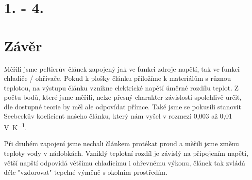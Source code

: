 \documentclass{protokol}
\begin{document}

%		
%		
%		
%		

\section{1. - 4.}



		
\section{Závěr}
	Měřili jsme peltierův článek zapojený jak ve funkci zdroje napětí, tak ve funkci chladiče / ohřívače. Pokud k plošky článku přiložíme k materiálům s různou teplotou, na výstupu článku vznikne elektrické napětí úměrné rozdílu teplot. Z počtu bodů, které jsme měřili, nelze přesný charakter závislosti spolehlivě určit, dle dostupné teorie by měl ale odpovídat přímce. Také jsme se pokusili stanovit Seebeckův koeficient našeho článku, který nám vyšel v rozmezí 0,003 až 0,01 \unit{\volt\per\kelvin}.
	
	Při druhém zapojení jsme nechali článkem protékat proud a měřili jsme změnu teploty vody v nádobkách. Vzniklý teplotní rozdíl je závislý na připojením napětí, větší napští odpovídá většímu chladícímu i ohřevnému výkonu, článek tak zvládá déle "vzdorovat" tepelné výměně s okolním prostředím.
\end{document}
